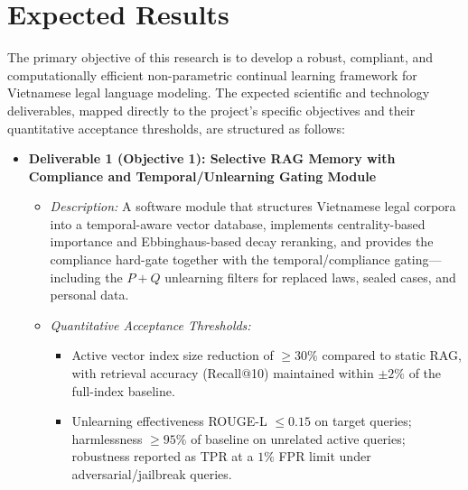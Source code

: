 \section{Expected Results}

The primary objective of this research is to develop a robust, compliant, and computationally efficient non-parametric continual learning framework for Vietnamese legal language modeling. The expected scientific and technology deliverables, mapped directly to the project's specific objectives and their quantitative acceptance thresholds, are structured as follows:

\begin{itemize}[leftmargin=*]
    \item \textbf{Deliverable 1 (Objective 1): Selective RAG Memory with Compliance and Temporal/Unlearning Gating Module}
    \begin{itemize}
        \item \textit{Description:} A software module that structures Vietnamese legal corpora into a temporal-aware vector database, implements centrality-based importance and Ebbinghaus-based decay reranking, and provides the compliance hard-gate together with the temporal/compliance gating---including the $P+Q$ unlearning filters for replaced laws, sealed cases, and personal data.
        \item \textit{Quantitative Acceptance Thresholds:}
        \begin{itemize}
            \item Active vector index size reduction of $\ge 30\%$ compared to static RAG, with retrieval accuracy (Recall@10) maintained within $\pm 2\%$ of the full-index baseline.
            \item Unlearning effectiveness ROUGE-L $\le 0.15$ on target queries; harmlessness $\ge 95\%$ of baseline on unrelated active queries; robustness reported as TPR at a $1\%$ FPR limit under adversarial/jailbreak queries.
        \end{itemize}
    \end{itemize}


\end{itemize}
